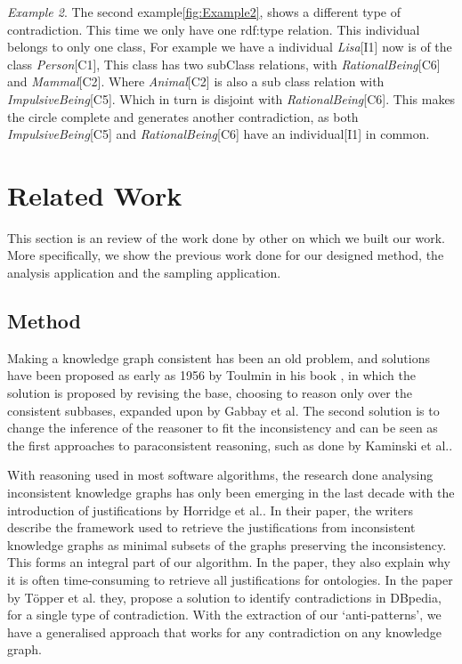 \documentclass[11pt,letterpaper ,oneside ]{book}
\begin{document}
	\textit{Example 2}. The second example\ref{fig:Example2}, shows a different type of contradiction. This time we only have one rdf:type relation. This individual belongs to only one class, For example we have a individual \textit{Lisa}[I1] now is of the class \textit{Person}[C1], This class has two subClass relations, with \textit{RationalBeing}[C6] and \textit{Mammal}[C2]. Where \textit{Animal}[C2] is also a sub class relation with \textit{ImpulsiveBeing}[C5]. Which in turn is disjoint with \textit{RationalBeing}[C6]. This makes the circle complete and generates another contradiction, as both \textit{ImpulsiveBeing}[C5] and \textit{RationalBeing}[C6] have an individual[I1] in common. \\
	
	
	\chapter{Related Work}\label{RelatedWork}
	This section is an review of the work done by other on which we built our work. More specifically, we show the previous work done for our designed method, the analysis application and the sampling application. 
	
	\section{Method}
	Making a knowledge graph consistent has been an old problem, and solutions have been proposed as early as 1956 by Toulmin in his book \cite{toulmin:1956}, in which the solution is proposed by revising the base, choosing to reason only over the consistent subbases, expanded upon by Gabbay et al\cite{Gabbay:1994}. The second solution is to change the inference of the reasoner to fit the inconsistency and can be seen as the first approaches to paraconsistent reasoning, such as done by Kaminski et al.\cite{Kaminski:2015}.
	
	With reasoning used in most software algorithms, the research done analysing inconsistent knowledge graphs has only been emerging in the last decade with the introduction of justifications by Horridge et al.\cite{Horridge:2009}. In their paper, the writers describe the framework used to retrieve the justifications from inconsistent knowledge graphs as minimal subsets of the graphs preserving the inconsistency. This forms an integral part of our algorithm. In the paper, they also explain why it is often time-consuming to retrieve all justifications for ontologies. In the paper by T\"{o}pper et al.\cite{Topper:2012} they, propose a solution to identify contradictions in DBpedia, for a single type of contradiction. With the extraction of our `anti-patterns', we have a generalised approach that works for any contradiction on any knowledge graph. \\
	
\end{document}

